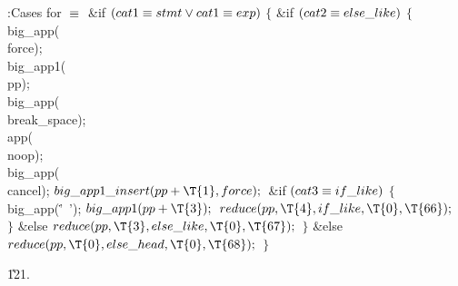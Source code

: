 \B{}:Cases for \X${}\equiv{}$\6
\&{if} ${}(\\{cat1}\equiv\\{stmt}\lor\\{cat1}\equiv\\{exp}){}$\5
${}\{{}$\1\6
\&{if} ${}(\\{cat2}\equiv\\{else\_like}){}$\5
${}\{{}$\1\6
\\{big\_app}(\\{force});\6
\\{big\_app1}(\\{pp});\6
\\{big\_app}(\\{break\_space});\6
\\{app}(\\{noop});\6
\\{big\_app}(\\{cancel});\6
${}\\{big\_app1\_insert}(\\{pp}+\T{1},\39\\{force});{}$\6
\&{if} ${}(\\{cat3}\equiv\\{if\_like}){}$\5
${}\{{}$\1\6
\\{big\_app}(\.{'\ '});\6
${}\\{big\_app1}(\\{pp}+\T{3});{}$\6
${}\\{reduce}(\\{pp},\39\T{4},\39\\{if\_like},\39\T{0},\39\T{66});{}$\6
\4${}\}{}$\2\6
\&{else}\1\5
${}\\{reduce}(\\{pp},\39\T{3},\39\\{else\_like},\39\T{0},\39\T{67});{}$\2\6
\4${}\}{}$\2\6
\&{else}\1\5
${}\\{reduce}(\\{pp},\39\T{0},\39\\{else\_head},\39\T{0},\39\T{68});{}$\2\6
\4${}\}{}$\2\par
\U121.\fi

